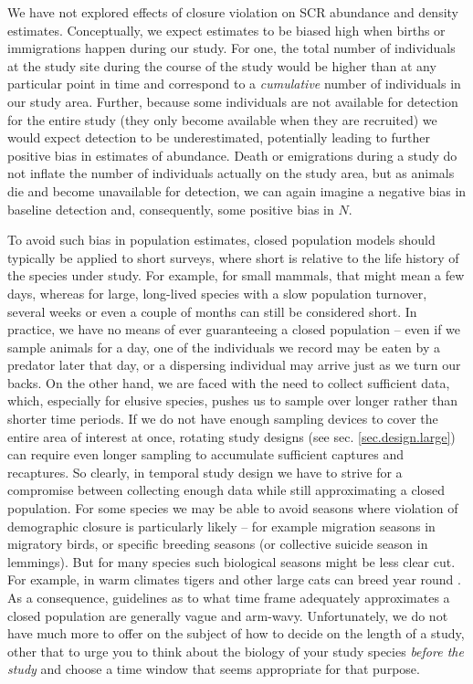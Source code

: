 We have not explored effects of closure violation on SCR abundance and
density estimates. Conceptually, we expect estimates to be biased high
when births or immigrations happen during our study. For one, the
total number of individuals at the study site during the course of the
study would be higher than at any particular point in time and
correspond to a {\it cumulative} number of individuals in our study
area. Further, because some individuals are not available for
detection for the entire study (they only become available when they
are recruited) we would expect detection to be underestimated,
potentially leading to further positive bias in estimates of
abundance. Death or emigrations during a study do not inflate the
number of individuals actually on the study area, but as animals die
and become unavailable for detection, we can again imagine a negative
bias in baseline detection and, consequently, some positive bias in
$N$.

To avoid such bias in population estimates, closed population models
should typically be applied to short surveys, where short is relative
to the life history of the species under study. For example, for small
mammals, that might mean a few days, whereas for large, long-lived
species with a slow population turnover, several weeks or even a
couple of months can still be considered short. In practice, we have
no means of ever guaranteeing a closed population -- even if we sample
animals for a day, one of the individuals we record may be eaten by a
predator later that day, or a dispersing individual may arrive just as
we turn our backs. On the other hand, we are faced with the need to
collect sufficient data, which, especially for elusive species, pushes
us to sample over longer rather than shorter time periods. If we do
not have enough sampling devices to cover the entire area of interest
at once, rotating study designs (see sec. \ref{sec.design.large}) can require even
longer sampling to accumulate sufficient captures and recaptures. So
clearly, in temporal study design we have to strive for a compromise
between collecting enough data while still approximating a closed
population.  For some species we may be able to avoid seasons where
violation of demographic closure is particularly likely -- for example
migration seasons in migratory birds, or specific breeding seasons (or
collective suicide season in lemmings). But for many species such
biological seasons might be less clear cut. For example, in warm
climates tigers and other large cats can breed year round
\citep{nowak:1999}. As a consequence, guidelines as to what time frame
adequately approximates a closed population are generally vague and
arm-wavy. Unfortunately, we do not have much more to offer on the
subject of how to decide on the length of a study, other that to urge
you to think about the biology of your study species {\it before the
  study} and choose a time window that seems appropriate for that
purpose.

